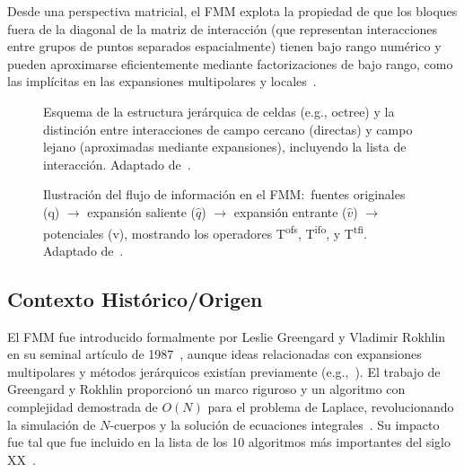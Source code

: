 Desde una perspectiva matricial, el FMM explota la propiedad de que los bloques fuera de la diagonal de la matriz de interacción (que representan interacciones entre grupos de puntos separados espacialmente) tienen bajo rango numérico y pueden aproximarse eficientemente mediante factorizaciones de bajo rango, como las implícitas en las expansiones multipolares y locales~\cite{ChenSF, Martinsson2012}.

\begin{figure}[htbp]
    \centering
    \caption{Esquema de la estructura jerárquica de celdas (e.g., octree) y la distinción entre interacciones de campo cercano (directas) y campo lejano (aproximadas mediante expansiones), incluyendo la lista de interacción. Adaptado de~\cite{GreengardRokhlin1987, Ying2012}.}%
    \label{fig:fmm_hierarchy}
\end{figure}

\begin{figure}[htbp]
    \centering
    \caption{Ilustración del flujo de información en el FMM:\ fuentes originales (q) $\rightarrow$ expansión saliente ($\hat{q}$) $\rightarrow$ expansión entrante ($\hat{v}$) $\rightarrow$ potenciales (v), mostrando los operadores T\textsuperscript{ofs}, T\textsuperscript{ifo}, y T\textsuperscript{tfi}. Adaptado de~\cite{Martinsson2012}.}%
    \label{fig:fmm_translations}
\end{figure}


\subsection{Contexto Histórico/Origen}

El FMM fue introducido formalmente por Leslie Greengard y Vladimir Rokhlin en su seminal artículo de 1987~\cite{GreengardRokhlin1987}, aunque ideas relacionadas con expansiones multipolares y métodos jerárquicos existían previamente (e.g.,~\cite{Appel1985, BarnesHut1986}). El trabajo de Greengard y Rokhlin proporcionó un marco riguroso y un algoritmo con complejidad demostrada de $O(N)$ para el problema de Laplace, revolucionando la simulación de $N$-cuerpos y la solución de ecuaciones integrales~\cite{GreengardRokhlin1987}. Su impacto fue tal que fue incluido en la lista de los 10 algoritmos más importantes del siglo XX~\cite{Cipra2000}.


